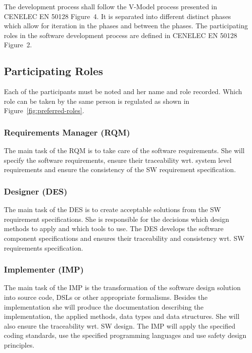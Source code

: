 
The development process shall follow the V-Model process presented in CENELEC EN
50128 Figure~4. It is separated into different distinct phases which allow for
iteration in the phases and between the phases. The participating roles in the
software development process are defined in CENELEC EN 50128 Figure~2.

\subsection{Participating Roles}
\label{sec:participating-roles}

Each of the participants must be noted and her name and role recorded. Which
role can be taken by the same person is regulated as shown in
Figure~\ref{fig:preferred-roles}.

\subsubsection{Requirements Manager (RQM)}
\label{sec:requ-magang-rqm}

The main task of the RQM is to take care of the software requirements. She will
specify the software requirements, ensure their traceability wrt. system level
requirements and ensure the consistency of the SW requirement specification.

\subsubsection{Designer (DES)}
\label{sec:designer}

The main task of the DES is to create acceptable solutions from the SW
requirement specifications. She is responsible for the decisions which design
methods to apply and which tools to use. The DES develops the software component
specifications and ensures their traceability and consistency wrt. SW
requirements specification.

\subsubsection{Implementer (IMP)}
\label{sec:implementer}

The main task of the IMP is the transformation of the software design solution
into source code, DSLs or other appropriate formalisms. Besides the
implementation she will produce the documentation describing the implementation,
the applied methods, data types and data structures. She will also ensure the
traceability wrt. SW design. The IMP will apply the specified coding standards,
use the specified programming languages and use safety design principles.


